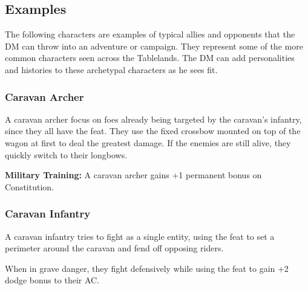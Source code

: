 \subsection{Examples}
The following characters are examples of typical allies and opponents that the DM can throw into an adventure or campaign. They represent some of the more common characters seen across the Tablelands. The DM can add personalities and histories to these archetypal characters as he sees fit.

\subsubsection{Caravan Archer}

A caravan archer focus on foes already being targeted by the caravan's infantry, since they all have the  feat. They use the fixed crossbow mounted on top of the wagon at first to deal the greatest damage. If the enemies are still alive, they quickly switch to their longbows.

\textbf{Military Training:} A caravan archer gains +1 permanent bonus on Constitution.

\subsubsection{Caravan Infantry}

A caravan infantry tries to fight as a single entity, using the  feat to set a perimeter around the caravan and fend off opposing riders.

When in grave danger, they fight defensively while using the  feat to gain +2 dodge bonus to their AC.

